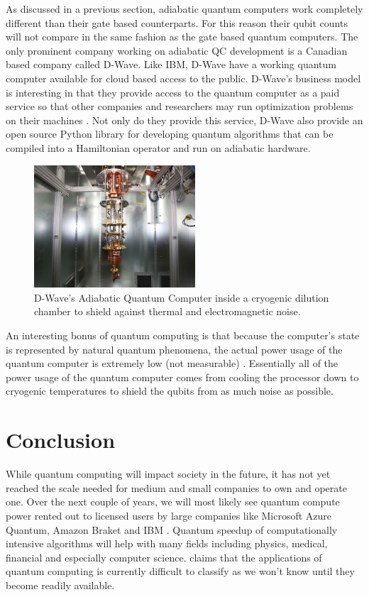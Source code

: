 \documentclass[conference]{IEEEtran}
\begin{document}
As discussed in a previous section, adiabatic quantum computers work completely different than their gate based counterparts. For this reason their qubit counts will not compare in the same fashion as the gate based quantum computers. The only prominent company working on adiabatic QC development is a Canadian based company called D-Wave. Like IBM, D-Wave have a working quantum computer available for cloud based access to the public. D-Wave's business model is interesting in that they provide access to the quantum computer as a paid service so that other companies and researchers may run optimization problems on their machines \cite{b13}. Not only do they provide this service, D-Wave also provide an open source Python library for developing quantum algorithms that can be compiled into a Hamiltonian operator and run on adiabatic hardware.

\begin{figure}[htbp]
\centerline{\includegraphics[width=6cm]{dwave}}
\caption{D-Wave's Adiabatic Quantum Computer inside a cryogenic dilution chamber to shield against thermal and electromagnetic noise.}
\label{dwave}
\end{figure}

An interesting bonus of quantum computing is that because the computer's state is represented by natural quantum phenomena, the actual power usage of the quantum computer is extremely low (not measurable) \cite{b13}. Essentially all of the power usage of the quantum computer comes from cooling the processor down to cryogenic temperatures to shield the qubits from as much noise as possible.

\section{Conclusion}

While quantum computing will impact society in the future, it has not yet reached the scale needed for medium and small companies to own and operate one. Over the next couple of years, we will most likely see quantum compute power rented out to licensed users by large companies like Microsoft Azure Quantum, Amazon Braket and IBM  \cite{b1}. Quantum speedup of computationally intensive algorithms will help with many fields including physics, medical, financial and especially computer science. \cite{b2} claims that the applications of quantum computing is currently difficult to classify as we won't know until they become readily available.
\end{document}
